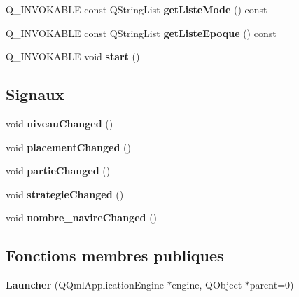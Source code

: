 \begin{DoxyCompactItemize}
\item 
Q\+\_\+\+I\+N\+V\+O\+K\+A\+B\+LE const Q\+String\+List {\bfseries get\+Liste\+Mode} () const \hypertarget{class_launcher_aa5a95be43fa5e9c893ac63497dc33b62}{}\label{class_launcher_aa5a95be43fa5e9c893ac63497dc33b62}

\item 
Q\+\_\+\+I\+N\+V\+O\+K\+A\+B\+LE const Q\+String\+List {\bfseries get\+Liste\+Epoque} () const \hypertarget{class_launcher_a1d72251df85672b9990bb4eb29864cd9}{}\label{class_launcher_a1d72251df85672b9990bb4eb29864cd9}

\item 
Q\+\_\+\+I\+N\+V\+O\+K\+A\+B\+LE void {\bfseries start} ()\hypertarget{class_launcher_a31ee0ccbd35abeaa5b78b4d330278ca3}{}\label{class_launcher_a31ee0ccbd35abeaa5b78b4d330278ca3}

\end{DoxyCompactItemize}
\subsection*{Signaux}
\begin{DoxyCompactItemize}
\item 
void {\bfseries niveau\+Changed} ()\hypertarget{class_launcher_ab1f9224509580eba78c05741aefca0bd}{}\label{class_launcher_ab1f9224509580eba78c05741aefca0bd}

\item 
void {\bfseries placement\+Changed} ()\hypertarget{class_launcher_af3a5eb7de657dfa21c0c26b8dbd8ca07}{}\label{class_launcher_af3a5eb7de657dfa21c0c26b8dbd8ca07}

\item 
void {\bfseries partie\+Changed} ()\hypertarget{class_launcher_aa0ee62bf97439fb86c6c6c70de06592e}{}\label{class_launcher_aa0ee62bf97439fb86c6c6c70de06592e}

\item 
void {\bfseries strategie\+Changed} ()\hypertarget{class_launcher_a52fa53afdcf2f4acace21f011fba6532}{}\label{class_launcher_a52fa53afdcf2f4acace21f011fba6532}

\item 
void {\bfseries nombre\+\_\+navire\+Changed} ()\hypertarget{class_launcher_a4c707e424f1f193ce92d2c9768f774db}{}\label{class_launcher_a4c707e424f1f193ce92d2c9768f774db}

\end{DoxyCompactItemize}
\subsection*{Fonctions membres publiques}
\begin{DoxyCompactItemize}
\item 
{\bfseries Launcher} (Q\+Qml\+Application\+Engine $\ast$engine, Q\+Object $\ast$parent=0)\hypertarget{class_launcher_acbbd874223d4de183d20635d8cd65f44}{}\label{class_launcher_acbbd874223d4de183d20635d8cd65f44}

\end{DoxyCompactItemize}

